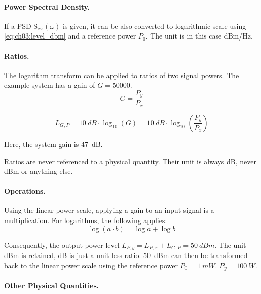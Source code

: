 \begin{refsection}
\paragraph{Power Spectral Density.}

If a \ac{PSD} $\mathrm{S}_{xx}(\omega)$ is given, it can be also converted to logarithmic scale using \eqref{eq:ch03:level_dbm} and a reference power $P_0$. The unit is in this case \si{dBm/Hz}.

\paragraph{Ratios.}
The logarithm transform can be applied to ratios of two signal powers. The example system has a gain of $G = 50000$.
\begin{equation}
	G = \frac{P_y}{P_x}
\end{equation}

\begin{equation}
	L_{G,P} = \SI{10}{dB} \cdot \log_{10} \left(G\right) = \SI{10}{dB} \cdot \log_{10} \left(\frac{P_y}{P_x}\right)
\end{equation}

Here, the system gain is \SI{47}{dB}.

\begin{attention}
	Ratios are never referenced to a physical quantity. Their unit is \underline{always \si{dB}}, never \si{dBm} or anything else.
\end{attention}

\paragraph{Operations.}

Using the linear power scale, applying a gain to an input signal is a multiplication. For logarithms, the following applies:
\begin{equation}
	\log \left(a \cdot b\right) = \log a + \log b
\end{equation}

Consequently, the output power level $L_{P,y} = L_{P,x} + L_{G,P} = \SI{50}{dBm}$. The unit \si{dBm} is retained, \si{dB} is just a unit-less ratio. \SI{50}{dBm} can then be transformed back to the linear power scale using the reference power $P_0 = \SI{1}{mW}$. $P_y = \SI{100}{W}$.

\paragraph{Other Physical Quantities.}


\end{refsection}

